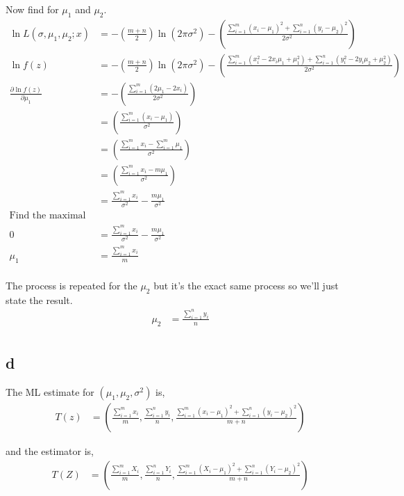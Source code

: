 \documentclass{article}
\begin{document}
Now find for $\mu_1$ and $\mu_2$.
\begin{align*}
    \ln L(\sigma, \mu_1, \mu_2;x) &= -\left(\frac{m+n}{2}\right) \ln\left(2\pi\sigma^2\right)
    -\left(\frac{\sum_{i=1}^m {(x_i-\mu_1)}^2 + \sum_{i=1}^n {(y_i-\mu_2)}^2}
    {2\sigma^2}\right) \\
    \ln f(z) &= -\left(\frac{m+n}{2}\right) \ln\left(2\pi\sigma^2\right)
    -\left(\frac{\sum_{i=1}^m {(x_i^2-2x_i\mu_1 + \mu_1^2)}
    + \sum_{i=1}^n {(y_i^2-2y_i\mu_2+\mu_2^2)}}
    {2\sigma^2}\right) \\
    \frac{\partial\ln f(z)}{\partial \mu_1}
    &= -\left(\frac{\sum_{i=1}^m {(2\mu_1 - 2x_i)}}
    {2\sigma^2}\right) \\
    &= \left(\frac{\sum_{i=1}^m {(x_i - \mu_1)}}
    {\sigma^2}\right) \\
    &= \left(\frac{\sum_{i=1}^m x_i - \sum_{i=1}^m\mu_1}
    {\sigma^2}\right) \\
    &= \left(\frac{\sum_{i=1}^m x_i - m\mu_1}
    {\sigma^2}\right) \\
    &= \frac{\sum_{i=1}^m x_i}{\sigma^2} - \frac{m\mu_1}{\sigma^2} \\
    \text{Find the maximal point} \\
    0 &= \frac{\sum_{i=1}^m x_i}{\sigma^2} - \frac{m\mu_1}{\sigma^2} \\
    \mu_1 &= \frac{\sum_{i=1}^m x_i}{m} \\
\end{align*}

The process is repeated for the $\mu_2$ but it's the exact same process so we'll
just state the result.
\begin{align*}
    \mu_2 &= \frac{\sum_{i=1}^n y_i}{n} \\
\end{align*}

\subsection{d}
The ML estimate for $(\mu_1, \mu_2, \sigma^2)$ is,
\begin{align*}
    T(z) &= \left(\frac{\sum_{i=1}^m x_i}{m},\frac{\sum_{i=1}^n y_i}{n},
    \frac{\sum_{i=1}^m {(x_i-\mu_1)}^2 + \sum_{i=1}^n {(y_i-\mu_2)}^2}{m+n}\right)
\end{align*}

and the estimator is,
\begin{align*}
    T(Z) &= \left(\frac{\sum_{i=1}^m X_i}{m},\frac{\sum_{i=1}^n Y_i}{n},
    \frac{\sum_{i=1}^m {(X_i-\mu_1)}^2 + \sum_{i=1}^n {(Y_i-\mu_2)}^2}{m+n}\right)
\end{align*}
\end{document}
